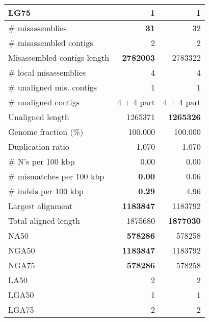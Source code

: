 \documentclass[12pt,a4paper]{article}
\begin{document}
\begin{table}[ht]
\begin{center}
\begin{tabular}{|l*{2}{|r}|}
LG75 & 1 & 1 \\ \hline
\# misassemblies & {\bf 31} & 32 \\ \hline
\# misassembled contigs & 2 & 2 \\ \hline
Misassembled contigs length & {\bf 2782003} & 2783322 \\ \hline
\# local misassemblies & 4 & 4 \\ \hline
\# unaligned mis. contigs & 1 & 1 \\ \hline
\# unaligned contigs & 4 + 4 part & 4 + 4 part \\ \hline
Unaligned length & 1265371 & {\bf 1265326} \\ \hline
Genome fraction (\%) & 100.000 & 100.000 \\ \hline
Duplication ratio & 1.070 & 1.070 \\ \hline
\# N's per 100 kbp & 0.00 & 0.00 \\ \hline
\# mismatches per 100 kbp & {\bf 0.00} & 0.06 \\ \hline
\# indels per 100 kbp & {\bf 0.29} & 4.96 \\ \hline
Largest alignment & {\bf 1183847} & 1183792 \\ \hline
Total aligned length & 1875680 & {\bf 1877030} \\ \hline
NA50 & {\bf 578286} & 578258 \\ \hline
NGA50 & {\bf 1183847} & 1183792 \\ \hline
NGA75 & {\bf 578286} & 578258 \\ \hline
LA50 & 2 & 2 \\ \hline
LGA50 & 1 & 1 \\ \hline
LGA75 & 2 & 2 \\ \hline
\end{tabular}
\end{center}
\end{table}
\end{document}
